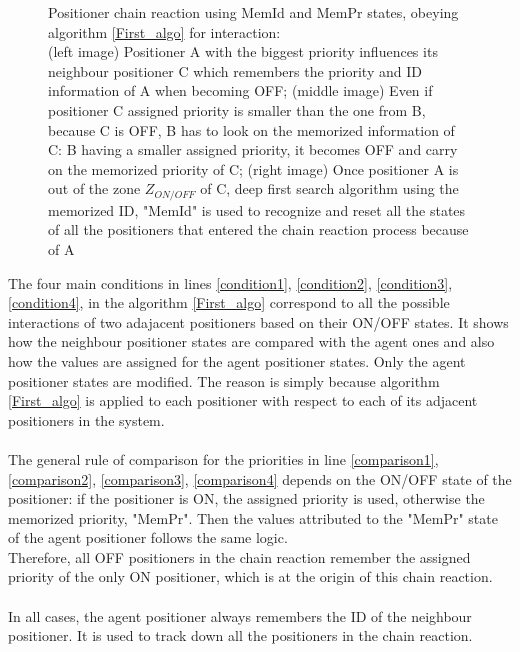 \documentclass[]{spie}  %
\begin{document}
\begin{figure}[H]
\begin{minipage}[t]{5.4cm}
 			\label{ID_PR2}
 		\end{minipage}
 		\caption{\centering Positioner chain reaction using MemId and MemPr states, obeying algorithm \ref{First_algo} for interaction:\\
 			(left image) Positioner A with the biggest priority influences its neighbour positioner C which remembers the priority and ID information of A when becoming OFF; (middle image) Even if positioner C assigned priority is smaller than the one from B, because C is OFF, B has to look on the memorized information of C: B having a smaller assigned priority, it becomes OFF and carry on the memorized priority of C; (right image) Once positioner A is out of the zone $Z_{ON/OFF}$ of C, deep first search algorithm using the memorized ID, "MemId" is used to recognize and reset all the states of all the positioners that entered the chain reaction process because of A }
 		\label{ID_PR}
 	\end{figure}
	   The four main conditions in lines \ref{condition1}, \ref{condition2}, \ref{condition3}, \ref{condition4}, in the algorithm \ref{First_algo} correspond to all the possible interactions of two adajacent positioners based on their ON/OFF states. It shows how the neighbour positioner states are compared with the agent ones and also how the values are assigned for the agent positioner states. Only the agent positioner states are modified. The reason is simply because algorithm \ref{First_algo} is applied to each positioner with respect to each of its adjacent positioners in the system.\\\\
	The general rule of comparison for the priorities in line \ref{comparison1}, \ref{comparison2}, \ref{comparison3}, \ref{comparison4} depends on the ON/OFF state of the positioner: if the positioner is ON, the assigned priority is used, otherwise the memorized priority, "MemPr". Then the values attributed to the "MemPr" state of the agent positioner follows the same logic.\\
	Therefore, all OFF positioners in the chain reaction remember the assigned priority of the only ON positioner, which is at the origin of this chain reaction.\\\\	
	In all cases, the agent positioner always remembers the ID of the neighbour positioner. It is used to track down all the positioners in the chain reaction.
	
\end{document}
